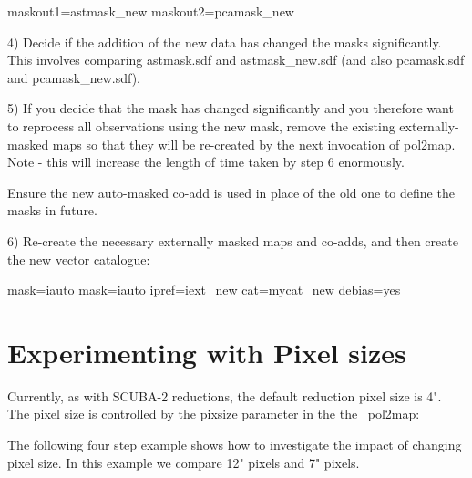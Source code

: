 \begin{terminalv}
maskout1=astmask_new           maskout2=pcamask_new
\end{terminalv}


4) Decide if the addition of the new data has changed the masks significantly. This involves
comparing astmask.sdf and astmask_new.sdf (and also pcamask.sdf and pcamask_new.sdf).


5) If you decide that the mask has changed significantly and you therefore want to
reprocess all observations using the new mask, remove the existing externally-masked 
maps so that they will be re-created by the next invocation of pol2map.  Note - this will
increase the length of time taken by step 6 enormously.

Ensure the new auto-masked co-add is used in place of the old one to define the masks in future.

\begin{terminalv}
\end{terminalv}

6) Re-create the necessary externally masked maps and co-adds, and then create the new
vector catalogue:

\begin{terminalv}
     mask=iauto
     mask=iauto ipref=iext_new cat=mycat_new debias=yes
\end{terminalv}

\section{Experimenting with Pixel sizes}

Currently, as with SCUBA-2 reductions, the default reduction pixel size is 4".
The pixel size is controlled by the pixsize parameter in the the \smurf\ pol2map:

\begin{terminalv}
\end{terminalv}


The following four step example shows how to investigate the impact of changing pixel size.
In this example we compare 12" pixels and 7" pixels.


